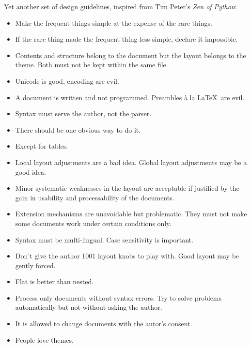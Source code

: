 \documentclass[12pt,openany]{book}
\begin{document}
Yet another set of design guidelines, inspired from Tim Peter's \emph{Zen of Python}:

\begin{itemize}
\item Make the frequent things simple at the expense of the rare things.

\item If the rare thing made the frequent thing less simple, declare it
  impossible.

\item Contents and structure belong to the document but the layout belongs to
  the theme.  Both must not be kept within the same file.

\item Unicode is good, encoding are evil.

\item A document is written and not programmed.  Preambles à la \LaTeX\ are
  evil.

\item Syntax must serve the author, not the parser.

\item There should be one obvious way to do it.

\item Except for tables.

\item Local layout adjustments are a bad idea.  Global layout adjustments may
  be a good idea.

\item Minor systematic weaknesses in the layout are acceptable if justified by
  the gain in usability and processability of the documents.

\item Extension mechanisms are unavoidable but problematic.  They must not make
  some documents work under certain conditions only.
  
\item Syntax must be multi-lingual.  Case sensitivity is important.
  
\item Don't give the author 1001 layout knobs to play with.  Good layout may be
  gently forced.
  
\item Flat is better than nested.

\item Process only documents without syntax errors.  Try to solve problems
  automatically but not without asking the author.

\item It is allowed to change documents with the autor's consent.

\item People love themes.
\end{itemize}
\end{document}
